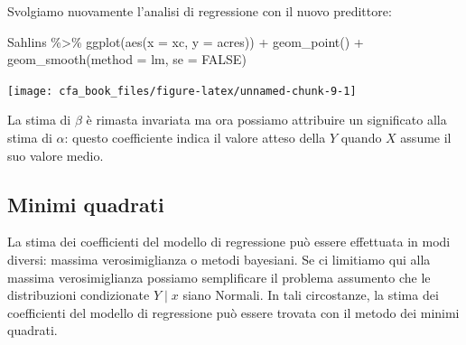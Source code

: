 \documentclass[
  11pt,
]{krantz}
\makeatletter
\newenvironment{Shaded}{\begin{snugshade}}{\end{snugshade}}
\newcommand{\AttributeTok}[1]{\textcolor[rgb]{0.61,0.61,0.61}{#1}}
\newcommand{\CommentTok}[1]{\textcolor[rgb]{0.37,0.37,0.37}{\textit{#1}}}
\newcommand{\ConstantTok}[1]{\textcolor[rgb]{0,0,0}{#1}}
\newcommand{\FunctionTok}[1]{\textcolor[rgb]{0,0,0}{#1}}
\newcommand{\NormalTok}[1]{#1}
\newcommand{\OtherTok}[1]{\textcolor[rgb]{0.37,0.37,0.37}{#1}}
\newcommand{\SpecialCharTok}[1]{\textcolor[rgb]{0,0,0}{#1}}
\newenvironment{kframe}{%
\medskip{}
\setlength{\fboxsep}{.8em}
 \def\at@end@of@kframe{}%
 \ifinner\ifhmode%
  \def\at@end@of@kframe{\end{minipage}}%
  \begin{minipage}{\columnwidth}%
 \fi\fi%
 \def\FrameCommand##1{\hskip\@totalleftmargin \hskip-\fboxsep
 \colorbox{shadecolor}{##1}\hskip-\fboxsep
     \hskip-\linewidth \hskip-\@totalleftmargin \hskip\columnwidth}%
 \MakeFramed {\advance\hsize-\width
   \@totalleftmargin\z@ \linewidth\hsize
   \@setminipage}}%
 {\par\unskip\endMakeFramed%
 \at@end@of@kframe}
\renewenvironment{Shaded}{\begin{kframe}}{\end{kframe}}
\theoremstyle{definition}
\theoremstyle{definition}
\theoremstyle{definition}
\theoremstyle{definition}
\theoremstyle{remark}
\makeatother
\begin{document}
Svolgiamo nuovamente l'analisi di regressione con il nuovo predittore:

\begin{Shaded}
\end{Shaded}

\begin{Shaded}
\begin{Highlighting}[]
\NormalTok{Sahlins }\SpecialCharTok{\%\textgreater{}\%}
  \FunctionTok{ggplot}\NormalTok{(}\FunctionTok{aes}\NormalTok{(}\AttributeTok{x =}\NormalTok{ xc, }\AttributeTok{y =}\NormalTok{ acres)) }\SpecialCharTok{+}
  \FunctionTok{geom\_point}\NormalTok{() }\SpecialCharTok{+}
  \FunctionTok{geom\_smooth}\NormalTok{(}\AttributeTok{method =}\NormalTok{ lm, }\AttributeTok{se =} \ConstantTok{FALSE}\NormalTok{)}
\end{Highlighting}
\end{Shaded}

\begin{center}\texttt{[image: cfa\_book\_files/figure-latex/unnamed-chunk-9-1]} \end{center}

La stima di \(\beta\) è rimasta invariata ma ora possiamo attribuire un significato alla stima di \(\alpha\): questo coefficiente indica il valore atteso della \(Y\) quando \(X\) assume il suo valore medio.

\hypertarget{minimi-quadrati}{%
\subsection{Minimi quadrati}\label{minimi-quadrati}}

La stima dei coefficienti del modello di regressione può essere effettuata in modi diversi: massima verosimiglianza o metodi bayesiani. Se ci limitiamo qui alla massima verosimiglianza possiamo semplificare il problema assumento che le distribuzioni condizionate \(Y \mid x\) siano Normali. In tali circostanze, la stima dei coefficienti del modello di regressione può essere trovata con il metodo dei minimi quadrati.
\end{document}

